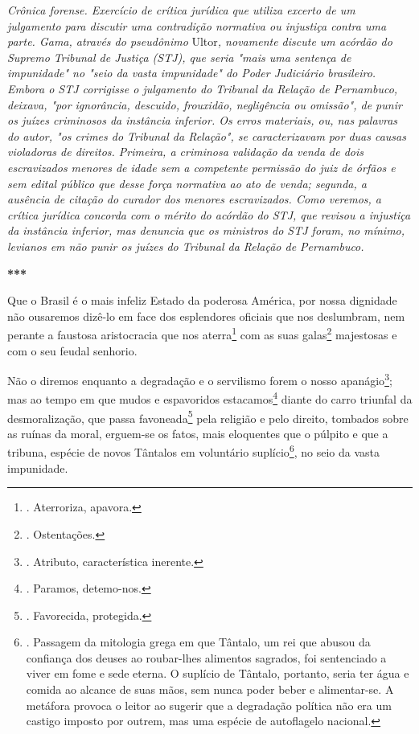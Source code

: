 \emph{Crônica forense. Exercício de crítica jurídica que utiliza excerto
de um julgamento para discutir uma contradição normativa ou injustiça
contra uma parte. Gama, através do pseudônimo} Ultor\emph{, novamente
discute um acórdão do Supremo Tribunal de Justiça (STJ), que seria "mais
uma sentença de impunidade" no "seio da vasta impunidade" do Poder
Judiciário brasileiro. Embora o STJ corrigisse o julgamento do Tribunal
da Relação de Pernambuco, deixava, "por ignorância, descuido, frouxidão,
negligência ou omissão", de punir os juízes criminosos da instância
inferior. Os erros materiais, ou, nas palavras do autor, "os crimes do
Tribunal da Relação", se caracterizavam por duas causas violadoras de
direitos. Primeira, a criminosa validação da venda de dois escravizados
menores de idade sem a competente permissão do juiz de órfãos e sem
edital público que desse força normativa ao ato de venda; segunda, a
ausência de citação do curador dos menores escravizados. Como veremos, a
crítica jurídica concorda com o mérito do acórdão do STJ, que revisou a
injustiça da instância inferior, mas denuncia que os ministros do STJ
foram, no mínimo, levianos em não punir os juízes do Tribunal da Relação
de Pernambuco.}

\textbf{***}

Que o Brasil é o mais infeliz Estado da poderosa América, por nossa
dignidade não ousaremos dizê-lo em face dos esplendores oficiais que nos
deslumbram, nem perante a faustosa aristocracia que nos
aterra\footnote{. Aterroriza, apavora.} com as suas galas\footnote{.
  Ostentações.} majestosas e com o seu feudal senhorio.

Não o diremos enquanto a degradação e o servilismo forem o nosso
apanágio\footnote{. Atributo, característica inerente.}; mas ao tempo em
que mudos e espavoridos estacamos\footnote{. Paramos, detemo-nos.}
diante do carro triunfal da desmoralização, que passa
favoneada\footnote{. Favorecida, protegida.} pela religião e pelo
direito, tombados sobre as ruínas da moral, erguem-se os fatos, mais
eloquentes que o púlpito e que a tribuna, espécie de novos Tântalos em
voluntário suplício\footnote{. Passagem da mitologia grega em que
  Tântalo, um rei que abusou da confiança dos deuses ao roubar-lhes
  alimentos sagrados, foi sentenciado a viver em fome e sede eterna. O
  suplício de Tântalo, portanto, seria ter água e comida ao alcance de
  suas mãos, sem nunca poder beber e alimentar-se. A metáfora provoca o
  leitor ao sugerir que a degradação política não era um castigo imposto
  por outrem, mas uma espécie de autoflagelo nacional.}, no seio da
vasta impunidade.

